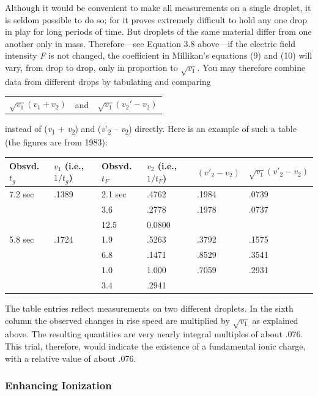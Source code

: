 Although it would be convenient to make all measurements on a single
droplet, it is seldom possible to do so; for it proves extremely
difficult to hold any one drop in play for long periods of time. But
droplets of the same material differ from one another only in mass.
Therefore---see Equation 3.8 above---if the electric field intensity
\emph{F} is not changed, the coefficient in Millikan's equations (9) and
(10) will vary, from drop to drop, only in proportion to $\sqrt{v_1}$. You may
therefore combine data from different drops by tabulating and comparing
\begin{center}
\begin{tabular}{ c c c }
$\sqrt{v_1}(v_1+v_2)$ & and & $\sqrt{v_1}(v_{2}'-v_2)$\\
\end{tabular}
\end{center}
instead of (\emph{v}\textsubscript{1} + \emph{v}\textsubscript{2}) and
(\emph{v}'\textsubscript{2} -- \emph{v}\textsubscript{2}) directly. Here
is an example of such a table (the figures are from 1983):

\begin{center}
\small
\begin{tabular}{l l l l l l}
\hline
Obsvd. $t_g$ & $v_1$ (i.e., $1/t_g$) & Obsvd. $t_F$ & $v_2$ (i.e., $1/t_F$) & $(v'_2-v_2)$ & $\sqrt{v_1}(v'_2-v_2)$\\
\hline
7.2 sec & .1389 & 2.1 sec & .4762 & .1984 & .0739\\
 & & 3.6 & .2778 & .1978 & .0737\\
 & & 12.5 & 0.0800 & &\\
5.8 sec & .1724 & 1.9 & .5263 & .3792 & .1575\\
 & & 6.8 & .1471 & .8529 & .3541\\
 & & 1.0 & 1.000 & .7059 & .2931\\
 & & 3.4 & .2941 & &\\
\end{tabular}
\end{center}

The table entries reflect measurements on two different droplets. In the
sixth column the observed changes in rise speed are multiplied by
$\sqrt{v_1}$ as explained above. The resulting quantities
are very nearly integral multiples of about .076. This trial, therefore,
would indicate the existence of a fundamental ionic charge, with a
relative value of about .076.

\subsubsection*{Enhancing Ionization}

